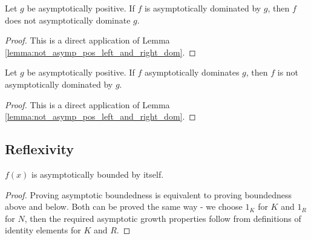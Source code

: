 \begin{theorem}
    \label{thm:not_asymp_pos_left_dom_of_right_dom}
    \leanok
    Let $g$ be asymptotically positive. If $f$ is asymptotically dominated by $g$, then
    $f$ does not asymptotically dominate $g$.
\end{theorem}

\begin{proof}
    \leanok
    This is a direct application of Lemma \ref{lemma:not_asymp_pos_left_and_right_dom}. 
\end{proof}

\begin{theorem}
    \label{thm:not_asymp_pos_right_dom_of_left_dom}
    \leanok
    Let $g$ be asymptotically positive. If $f$ asymptotically dominates $g$, then
    $f$ is not asymptotically dominated by $g$.
\end{theorem}

\begin{proof}
    \leanok
    This is a direct application of Lemma \ref{lemma:not_asymp_pos_left_and_right_dom}. 
\end{proof}


\subsection{Reflexivity}

\begin{lemma}
    \label{lemma:asymp_bounded_refl}
    \leanok
    $f(x)$ is asymptotically bounded by itself. 

\end{lemma}

\begin{proof}
    \leanok
    Proving asymptotic boundedness is equivalent to proving boundedness above and below.
    Both can be proved the same way - we choose $1_K$ for $K$ and $1_R$ for $N$, then the
    required asymptotic growth properties follow from definitions of identity elements for 
    $K$ and $R$.
\end{proof}

